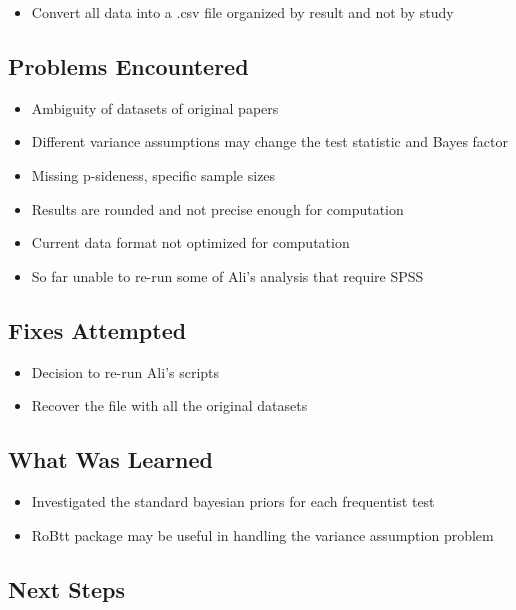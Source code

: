 \documentclass[11pt,a4paper]{article}
\begin{document}
\begin{itemize}
    \item Convert all data into a .csv file organized by result and not by study
\end{itemize}

\subsection{Problems Encountered}

\begin{itemize}
    \item Ambiguity of datasets of original papers
    \item Different variance assumptions may change the test statistic and Bayes factor
    \item Missing p-sideness, specific sample sizes
    \item Results are rounded and not precise enough for computation
    \item Current data format not optimized for computation
    \item So far unable to re-run some of Ali's analysis that require SPSS
\end{itemize}

\subsection{Fixes Attempted}

\begin{itemize}
    \item Decision to re-run Ali's scripts 
    \item Recover the file with all the original datasets
\end{itemize}

\subsection{What Was Learned}

\begin{itemize}
    \item Investigated the standard bayesian priors for each frequentist test
    \item RoBtt package may be useful in handling the variance assumption problem
\end{itemize}

\subsection{Next Steps}
\end{document}
